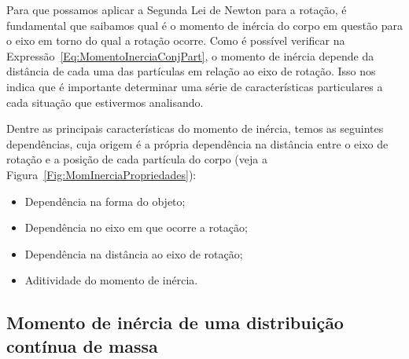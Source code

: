 Para que possamos aplicar a Segunda Lei de Newton para a rotação, é fundamental que saibamos qual é o momento de inércia do corpo em questão para o eixo em torno do qual a rotação ocorre. Como é possível verificar na Expressão~\ref{Eq:MomentoInerciaConjPart}, o momento de inércia depende da distância de cada uma das partículas em relação ao eixo de rotação. Isso nos indica que é importante determinar uma série de características particulares a cada situação que estivermos analisando.

Dentre as principais características do momento de inércia, temos as seguintes dependências, cuja origem é a própria dependência na distância entre o eixo de rotação e a posição de cada partícula do corpo (veja a Figura~\ref{Fig:MomInerciaPropriedades}):
\begin{itemize}
    \item Dependência na forma do objeto;
    \item Dependência no eixo em que ocorre a rotação;
    \item Dependência na distância ao eixo de rotação;
    \item Aditividade do momento de inércia.
\end{itemize}

\subsection{Momento de inércia de uma distribuição contínua de massa}

